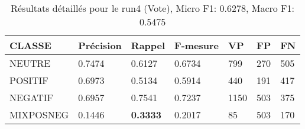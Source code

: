 \begin{table}
\begin{tabular}{l|l|l|l|l|l|l}
  CLASSE	&Précision	&Rappel	&F-mesure	&VP	&FP	&FN\\
\hline
  NEUTRE	&0.7474	&0.6127	&0.6734	&799	&270	&505\\
  POSITIF	&0.6973	&0.5134	&0.5914	&440	&191	&417\\
  NEGATIF	&0.6957	&0.7541	&0.7237	&1150	&503	&375\\
  MIXPOSNEG	&0.1446	&\textbf{0.3333}	&0.2017	&85	&503	&170\\
\hline
\end{tabular}
\caption{Résultats détaillés pour le run4 (Vote),
  Micro F1: 0.6278, Macro F1: 0.5475}
\end{table}
